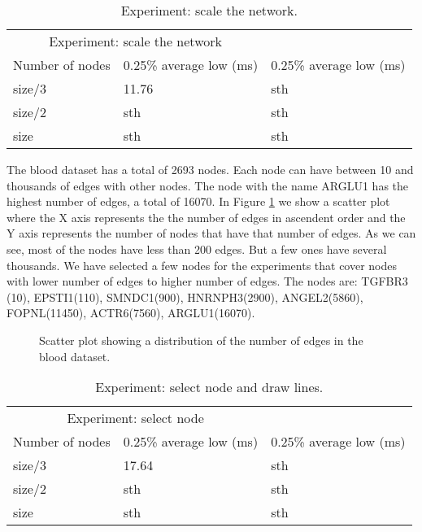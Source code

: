 \begin{table}[h!]
\centering
\begin{tabular}{lll}
\multicolumn{2}{c}{Experiment: scale the network} \\
Number of nodes & 0.25\% average low (ms) & 0.25\% average low (ms)  \\
size/3 & 11.76 & sth \\
size/2 & sth & sth \\
size & sth & sth \\
\end{tabular}
\caption{Experiment: scale the network.}
\label{tab:experiment_scale}
\end{table}

The blood dataset has a total of 2693 nodes. Each node can have between 10 and thousands of edges with other nodes. The node with the name ARGLU1 has the highest number of edges, a total of 16070. In Figure \ref{fig:edges_nodes_blood} we show a scatter plot where the X axis represents the the number of edges in ascendent order and the Y axis represents the number of nodes that have that number of edges. As we can see, most of the nodes have less than 200 edges. But a few ones have several thousands. We have selected a few nodes for the experiments that cover nodes with lower number of edges to higher number of edges.
The nodes are: TGFBR3 (10), EPSTI1(110), SMNDC1(900), HNRNPH3(2900), ANGEL2(5860), FOPNL(11450), ACTR6(7560), ARGLU1(16070).

\begin{figure}[h!]
  \centering
  \begin{minipage}{.7\textwidth}
  \end{minipage}
\caption{Scatter plot showing a distribution of the number of edges in the blood dataset.}
\label{fig:edges_nodes_blood}
\end{figure}

\begin{table}[h!]
\centering
\begin{tabular}{lll}
\multicolumn{2}{c}{Experiment: select node} \\
Number of nodes & 0.25\% average low (ms) & 0.25\% average low (ms) \\
size/3 & 17.64 & sth \\
size/2 & sth & sth \\
size & sth & sth \\
\end{tabular}
\caption{Experiment: select node and draw lines.}
\label{tab:experiment_select}
\end{table}

